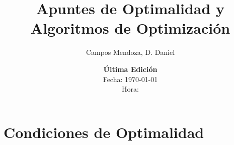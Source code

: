 \documentclass[book,spanish,10pt]{apuntes-scr}
\title[Análisis Convexo, Dualidad y Optimización]{Apuntes de Optimalidad y Algoritmos de Optimización}
\author{Campos Mendoza, D. Daniel}
\date{\normalsize
    \textbf{Última Edición} \\
    \vspace{0.5em}
    Fecha: \today \\
    Hora: \DTMcurrenttime 
}
\begin{document}
\maketitle

\frontmatter
\tableofcontents

\mainmatter

\part{Condiciones de Optimalidad}


























\end{document}
